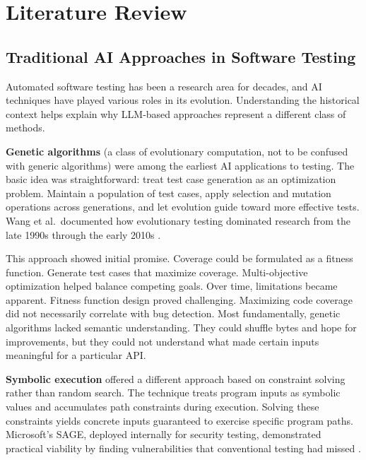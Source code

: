 
\chapter{Literature Review}
\label{chap:literature_review}

\section{Traditional AI Approaches in Software Testing}
\label{sec:lit_traditional_ai}

Automated software testing has been a research area for decades, and AI techniques have played various roles in its evolution. Understanding the historical context helps explain why LLM-based approaches represent a different class of methods.

\textbf{Genetic algorithms} (a class of evolutionary computation, not to be confused with generic algorithms) were among the earliest AI applications to testing. The basic idea was straightforward: treat test case generation as an optimization problem. Maintain a population of test cases, apply selection and mutation operations across generations, and let evolution guide toward more effective tests. Wang et al.\ documented how evolutionary testing dominated research from the late 1990s through the early 2010s \cite{MLFuzzReview2020}.

This approach showed initial promise. Coverage could be formulated as a fitness function. Generate test cases that maximize coverage. Multi-objective optimization helped balance competing goals. Over time, limitations became apparent. Fitness function design proved challenging. Maximizing code coverage did not necessarily correlate with bug detection. Most fundamentally, genetic algorithms lacked semantic understanding. They could shuffle bytes and hope for improvements, but they could not understand what made certain inputs meaningful for a particular API.

\textbf{Symbolic execution} offered a different approach based on constraint solving rather than random search. The technique treats program inputs as symbolic values and accumulates path constraints during execution. Solving these constraints yields concrete inputs guaranteed to exercise specific program paths. Microsoft's SAGE, deployed internally for security testing, demonstrated practical viability by finding vulnerabilities that conventional testing had missed \cite{SAGE2008}.

